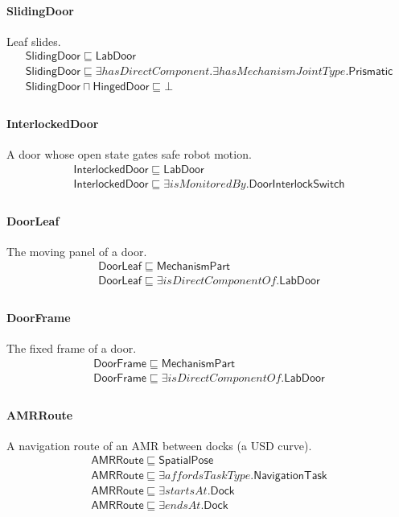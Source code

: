 \documentclass[10pt]{article}
\begin{document}
\paragraph{SlidingDoor} Leaf slides.
\[\begin{array}{l}
\mathsf{SlidingDoor} \sqsubseteq  \mathsf{LabDoor} \\
\mathsf{SlidingDoor} \sqsubseteq  \exists \mathit{hasDirectComponent}.\exists \mathit{hasMechanismJointType}.\mathsf{Prismatic} \\
\mathsf{SlidingDoor} \sqcap  \mathsf{HingedDoor} \sqsubseteq  \bot  \\
\end{array}\]
\paragraph{InterlockedDoor} A door whose open state gates safe robot motion.
\[\begin{array}{l}
\mathsf{InterlockedDoor} \sqsubseteq  \mathsf{LabDoor} \\
\mathsf{InterlockedDoor} \sqsubseteq  \exists \mathit{isMonitoredBy}.\mathsf{DoorInterlockSwitch} \\
\end{array}\]
\paragraph{DoorLeaf} The moving panel of a door.
\[\begin{array}{l}
\mathsf{DoorLeaf} \sqsubseteq  \mathsf{MechanismPart} \\
\mathsf{DoorLeaf} \sqsubseteq  \exists \mathit{isDirectComponentOf}.\mathsf{LabDoor} \\
\end{array}\]
\paragraph{DoorFrame} The fixed frame of a door.
\[\begin{array}{l}
\mathsf{DoorFrame} \sqsubseteq  \mathsf{MechanismPart} \\
\mathsf{DoorFrame} \sqsubseteq  \exists \mathit{isDirectComponentOf}.\mathsf{LabDoor} \\
\end{array}\]
\paragraph{AMRRoute} A navigation route of an AMR between docks (a USD curve).
\[\begin{array}{l}
\mathsf{AMRRoute} \sqsubseteq  \mathsf{SpatialPose} \\
\mathsf{AMRRoute} \sqsubseteq  \exists \mathit{affordsTaskType}.\mathsf{NavigationTask} \\
\mathsf{AMRRoute} \sqsubseteq  \exists \mathit{startsAt}.\mathsf{Dock} \\
\mathsf{AMRRoute} \sqsubseteq  \exists \mathit{endsAt}.\mathsf{Dock} \\
\end{array}\]
\end{document}
